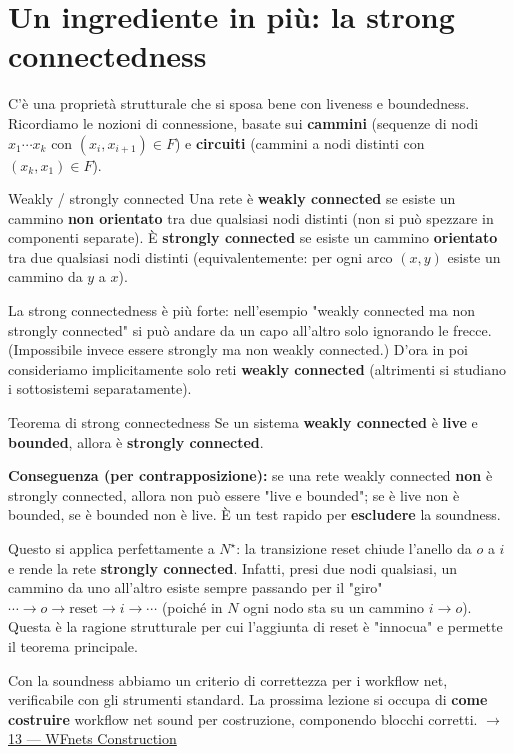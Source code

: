 \section{\texorpdfstring{Un ingrediente in più: la strong connectedness}{Un ingrediente in più: la strong connectedness}}

C'è una proprietà strutturale che si sposa bene con liveness e boundedness. Ricordiamo le nozioni di connessione, basate sui \textbf{cammini} (sequenze di nodi $x_1 \cdots x_k$ con $(x_i, x_{i+1}) \in F$) e \textbf{circuiti} (cammini a nodi distinti con $(x_k, x_1) \in F$).

\begin{boxdefinition}{Weakly / strongly connected}
Una rete è \textbf{weakly connected} se esiste un cammino \textbf{non orientato} tra due qualsiasi nodi distinti (non si può spezzare in componenti separate). È \textbf{strongly connected} se esiste un cammino \textbf{orientato} tra due qualsiasi nodi distinti (equivalentemente: per ogni arco $(x,y)$ esiste un cammino da $y$ a $x$).
\end{boxdefinition}

La strong connectedness è più forte: nell'esempio "weakly connected ma non strongly connected" si può andare da un capo all'altro solo ignorando le frecce. (Impossibile invece essere strongly ma non weakly connected.) D'ora in poi consideriamo implicitamente solo reti \textbf{weakly connected} (altrimenti si studiano i sottosistemi separatamente).

\begin{boxtheorem}{Teorema di strong connectedness}
Se un sistema \textbf{weakly connected} è \textbf{live} e \textbf{bounded}, allora è \textbf{strongly connected}.

\textbf{Conseguenza (per contrapposizione):} se una rete weakly connected \textbf{non} è strongly connected, allora non può essere "live e bounded"; se è live non è bounded, se è bounded non è live. È un test rapido per \textbf{escludere} la soundness.
\end{boxtheorem}

Questo si applica perfettamente a $N^\star$: la transizione reset chiude l'anello da $o$ a $i$ e rende la rete \textbf{strongly connected}. Infatti, presi due nodi qualsiasi, un cammino da uno all'altro esiste sempre passando per il "giro" $\cdots \to o \to \text{reset} \to i \to \cdots$ (poiché in $N$ ogni nodo sta su un cammino $i \to o$). Questa è la ragione strutturale per cui l'aggiunta di reset è "innocua" e permette il teorema principale.

Con la soundness abbiamo un criterio di correttezza per i workflow net, verificabile con gli strumenti standard. La prossima lezione si occupa di \textbf{come costruire} workflow net sound per costruzione, componendo blocchi corretti. $\rightarrow$ \hyperref[ch:13]{13 — WFnets Construction}